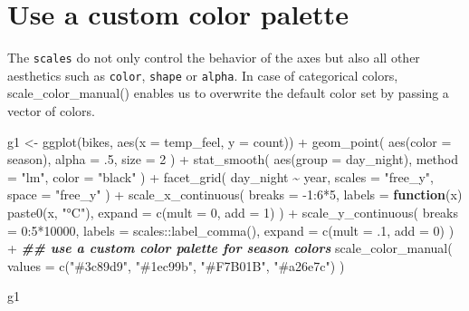 \documentclass[
]{krantz}
\makeatletter
\newenvironment{Shaded}{\begin{snugshade}}{\end{snugshade}}
\newcommand{\AttributeTok}[1]{\textcolor[rgb]{0.61,0.61,0.61}{#1}}
\newcommand{\ControlFlowTok}[1]{\textcolor[rgb]{0.27,0.27,0.27}{\textbf{#1}}}
\newcommand{\DecValTok}[1]{\textcolor[rgb]{0.06,0.06,0.06}{#1}}
\newcommand{\DocumentationTok}[1]{\textcolor[rgb]{0.37,0.37,0.37}{\textbf{\textit{#1}}}}
\newcommand{\FunctionTok}[1]{\textcolor[rgb]{0,0,0}{#1}}
\newcommand{\NormalTok}[1]{#1}
\newcommand{\OtherTok}[1]{\textcolor[rgb]{0.37,0.37,0.37}{#1}}
\newcommand{\SpecialCharTok}[1]{\textcolor[rgb]{0,0,0}{#1}}
\newcommand{\StringTok}[1]{\textcolor[rgb]{0.5,0.5,0.5}{#1}}
\newenvironment{kframe}{%
\medskip{}
\setlength{\fboxsep}{.8em}
 \def\at@end@of@kframe{}%
 \ifinner\ifhmode%
  \def\at@end@of@kframe{\end{minipage}}%
  \begin{minipage}{\columnwidth}%
 \fi\fi%
 \def\FrameCommand##1{\hskip\@totalleftmargin \hskip-\fboxsep
 \colorbox{shadecolor}{##1}\hskip-\fboxsep
     \hskip-\linewidth \hskip-\@totalleftmargin \hskip\columnwidth}%
 \MakeFramed {\advance\hsize-\width
   \@totalleftmargin\z@ \linewidth\hsize
   \@setminipage}}%
 {\par\unskip\endMakeFramed%
 \at@end@of@kframe}
\renewenvironment{Shaded}{\begin{kframe}}{\end{kframe}}
\makeatother
\begin{document}
\hypertarget{color-scaling}{%
\section{Use a custom color palette}\label{color-scaling}}

The \texttt{scales} do not only control the behavior of the axes but also all other aesthetics such as \texttt{color}, \texttt{shape} or \texttt{alpha}. In case of categorical colors, scale\_color\_manual() enables us to overwrite the default color set by passing a vector of colors.

\begin{Shaded}
\begin{Highlighting}[]
\NormalTok{g1 }\OtherTok{\textless{}{-}} \FunctionTok{ggplot}\NormalTok{(bikes, }\FunctionTok{aes}\NormalTok{(}\AttributeTok{x =}\NormalTok{ temp\_feel, }\AttributeTok{y =}\NormalTok{ count)) }\SpecialCharTok{+} 
  \FunctionTok{geom\_point}\NormalTok{(}
    \FunctionTok{aes}\NormalTok{(}\AttributeTok{color =}\NormalTok{ season), }\AttributeTok{alpha =}\NormalTok{ .}\DecValTok{5}\NormalTok{, }\AttributeTok{size =} \DecValTok{2}
\NormalTok{  ) }\SpecialCharTok{+} 
  \FunctionTok{stat\_smooth}\NormalTok{(}
    \FunctionTok{aes}\NormalTok{(}\AttributeTok{group =}\NormalTok{ day\_night), }\AttributeTok{method =} \StringTok{"lm"}\NormalTok{, }\AttributeTok{color =} \StringTok{"black"}
\NormalTok{  ) }\SpecialCharTok{+}
  \FunctionTok{facet\_grid}\NormalTok{(}
\NormalTok{    day\_night }\SpecialCharTok{\textasciitilde{}}\NormalTok{ year, }\AttributeTok{scales =} \StringTok{"free\_y"}\NormalTok{, }\AttributeTok{space =} \StringTok{"free\_y"}
\NormalTok{  ) }\SpecialCharTok{+}
  \FunctionTok{scale\_x\_continuous}\NormalTok{(}
    \AttributeTok{breaks =} \SpecialCharTok{{-}}\DecValTok{1}\SpecialCharTok{:}\DecValTok{6}\SpecialCharTok{*}\DecValTok{5}\NormalTok{, }\AttributeTok{labels =} \ControlFlowTok{function}\NormalTok{(x) }\FunctionTok{paste0}\NormalTok{(x, }\StringTok{"°C"}\NormalTok{), }\AttributeTok{expand =} \FunctionTok{c}\NormalTok{(}\AttributeTok{mult =} \DecValTok{0}\NormalTok{, }\AttributeTok{add =} \DecValTok{1}\NormalTok{)}
\NormalTok{  ) }\SpecialCharTok{+}
  \FunctionTok{scale\_y\_continuous}\NormalTok{(}
    \AttributeTok{breaks =} \DecValTok{0}\SpecialCharTok{:}\DecValTok{5}\SpecialCharTok{*}\DecValTok{10000}\NormalTok{, }\AttributeTok{labels =}\NormalTok{ scales}\SpecialCharTok{::}\FunctionTok{label\_comma}\NormalTok{(), }\AttributeTok{expand =} \FunctionTok{c}\NormalTok{(}\AttributeTok{mult =}\NormalTok{ .}\DecValTok{1}\NormalTok{, }\AttributeTok{add =} \DecValTok{0}\NormalTok{)}
\NormalTok{  ) }\SpecialCharTok{+}
  \DocumentationTok{\#\# use a custom color palette for season colors}
  \FunctionTok{scale\_color\_manual}\NormalTok{(}
    \AttributeTok{values =} \FunctionTok{c}\NormalTok{(}\StringTok{"\#3c89d9"}\NormalTok{, }\StringTok{"\#1ec99b"}\NormalTok{, }\StringTok{"\#F7B01B"}\NormalTok{, }\StringTok{"\#a26e7c"}\NormalTok{)}
\NormalTok{  )}

\NormalTok{g1}
\end{Highlighting}
\end{Shaded}
\end{document}

